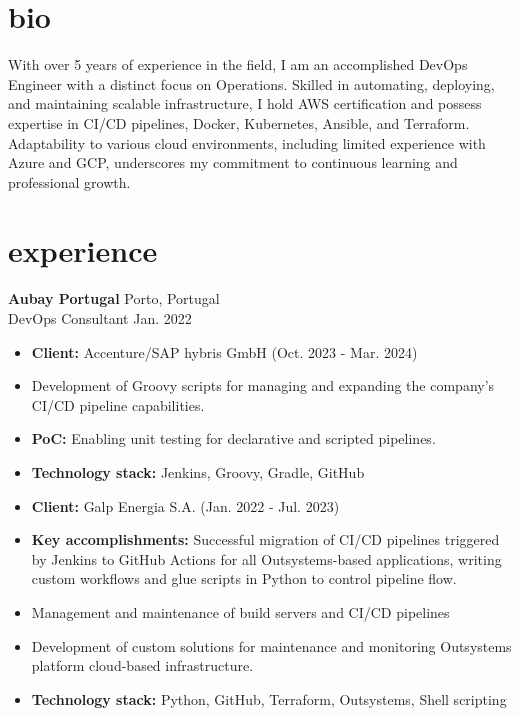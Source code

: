 \documentclass[12pt]{article}
\newcommand{\entry}[4]{{{\textbf{#1}}} \hfill #3 \\ #2 \hfill #4}
\begin{document}
\section{bio}
With over 5 years of experience in the field, I am an accomplished DevOps Engineer with a distinct focus on Operations. Skilled in automating, deploying, and maintaining scalable infrastructure, I hold AWS certification and possess expertise in CI/CD pipelines, Docker, Kubernetes, Ansible, and Terraform. Adaptability to various cloud environments, including limited experience with Azure and GCP, underscores my commitment to continuous learning and professional growth.

\section{experience}
\entry{Aubay Portugal}{DevOps Consultant}{Porto, Portugal}{Jan. 2022}
             \begin{itemize}[noitemsep,leftmargin=3.5mm,rightmargin=0mm,topsep=6pt]
  \item \textbf{Client:} Accenture/SAP hybris GmbH (Oct. 2023 - Mar. 2024) 
  \item Development of Groovy scripts for managing and expanding the company's CI/CD pipeline capabilities.
  \item \textbf{PoC:} Enabling unit testing for declarative and scripted pipelines.
  \item \textbf{Technology stack:} Jenkins, Groovy, Gradle, GitHub
  \medskip
  \item \textbf{Client:} Galp Energia S.A. (Jan. 2022 - Jul. 2023)
  \item \textbf{Key accomplishments:} Successful migration of CI/CD pipelines triggered by Jenkins to GitHub Actions for all Outsystems-based applications, writing custom workflows and glue scripts in Python to control pipeline flow.
  \item Management and maintenance of build servers and CI/CD pipelines
  \item Development of custom solutions for maintenance and monitoring Outsystems platform cloud-based
  infrastructure.
  \item \textbf{Technology stack:} Python, GitHub, Terraform, Outsystems, Shell scripting
\end{itemize}

\medskip
\end{document}
